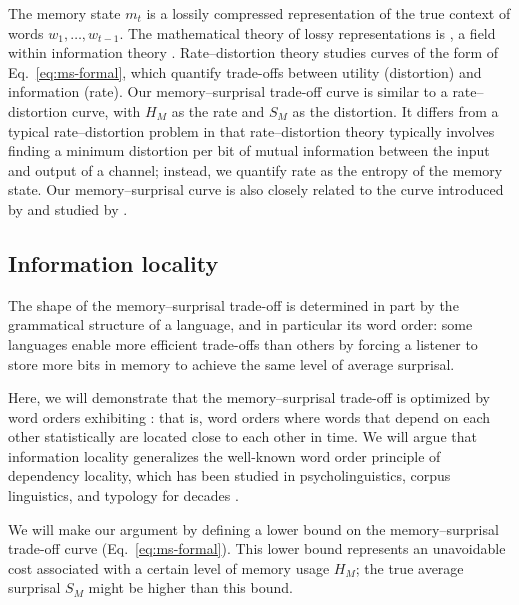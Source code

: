 The memory state $m_t$ is a lossily compressed representation of the true context of words $w_1, \dots, w_{t-1}$. The mathematical theory of lossy representations is , a field within information theory \citep[for an overview and key results, see][pp. 301--347]{cover2006elements}. Rate--distortion theory studies curves of the form of Eq.~\ref{eq:ms-formal}, which quantify trade-offs between utility (distortion) and information (rate). Our memory--surprisal trade-off curve is similar to a rate--distortion curve, with $H_M$ as the rate and $S_M$ as the distortion. It differs from a typical rate--distortion problem in that rate--distortion theory typically involves finding a minimum distortion per bit of mutual information between the input and output of a channel; instead, we quantify rate as the entropy of the memory state. Our memory--surprisal curve is also closely related to the  curve introduced by \citet{still-information-2014} and studied by \citet{marzen-predictive-2016}. 


\subsection{Information locality}

The shape of the memory--surprisal trade-off is determined in part by the grammatical structure of a language, and in particular its word order:
some languages enable more efficient trade-offs than others by forcing a listener to store more bits in memory to achieve the same level of average surprisal.

Here, we will demonstrate that the memory--surprisal trade-off is optimized by word orders exhibiting : that is, word orders where words that depend on each other statistically are located close to each other in time. We will argue that information locality generalizes the well-known word order principle of dependency locality, which has been studied in psycholinguistics, corpus linguistics, and typology for decades \citep{rijkhoff-word-1986,hawkins-performance-1994,gibson-linguistic-1998,liu-dependency-2018,futrell-large-scale-2015,liu-dependency-2017,temperley-minimizing-2018}. 

We will make our argument by defining a lower bound on the memory--surprisal trade-off curve (Eq.~\ref{eq:ms-formal}). This lower bound represents an unavoidable cost associated with a certain level of memory usage $H_M$; the true average surprisal $S_M$ might be higher than this bound. 

